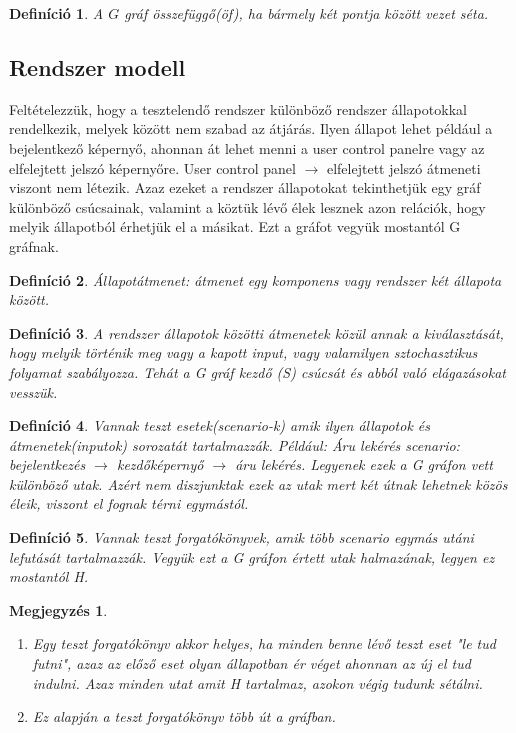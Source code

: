 \documentclass[12pt]{article}
\newtheorem{defin}{Definíció}[section]
\newtheorem{megj}{Megjegyzés}[section]
\begin{document}
\begin{defin}
A $G$ gráf összefüggő(öf), ha bármely két pontja között vezet séta. ~\cite{szam:Fleiner}
\end{defin}

\subsection{Rendszer modell}

Feltételezzük, hogy a tesztelendő rendszer különböző rendszer állapotokkal rendelkezik, melyek között nem szabad az átjárás. Ilyen állapot lehet például a bejelentkező képernyő, ahonnan át lehet menni a user control panelre vagy az elfelejtett jelszó képernyőre. User control panel $\rightarrow$ elfelejtett jelszó átmeneti viszont nem létezik. Azaz ezeket a rendszer állapotokat tekinthetjük egy gráf különböző csúcsainak, valamint a köztük lévő élek lesznek azon relációk, hogy melyik állapotból érhetjük el a másikat. Ezt a gráfot vegyük mostantól G gráfnak.\\

\begin{defin}
Állapotátmenet: átmenet egy komponens vagy rendszer két állapota között. ~\cite{htb:masterfield}
\end{defin}

\begin{defin}
A rendszer állapotok közötti átmenetek közül annak a kiválasztását, hogy melyik történik meg vagy a kapott input, vagy valamilyen sztochasztikus folyamat szabályozza. Tehát a G gráf kezdő (S) csúcsát és abból való elágazásokat vesszük.
\end{defin}

\begin{defin}
Vannak teszt esetek(scenario-k) amik ilyen állapotok és átmenetek(inputok) sorozatát tartalmazzák. Például: Áru lekérés scenario:  bejelentkezés $\rightarrow$ kezdőképernyő $\rightarrow$ áru lekérés. Legyenek ezek a G gráfon vett különböző utak. Azért nem diszjunktak ezek az utak mert két útnak lehetnek közös éleik, viszont el fognak térni egymástól.
\end{defin}

\begin{defin}
Vannak teszt forgatókönyvek, amik több scenario egymás utáni lefutását tartalmazzák. Vegyük ezt a G gráfon értett utak halmazának, legyen ez mostantól H.
\end{defin}

\begin{megj}
\begin{enumerate}
\item Egy teszt forgatókönyv akkor helyes, ha minden benne lévő teszt eset "le tud futni", azaz az előző eset olyan állapotban ér véget ahonnan az új el tud indulni. Azaz minden utat amit H tartalmaz, azokon végig tudunk sétálni.
\item Ez alapján a teszt forgatókönyv több út a gráfban.
\end{enumerate}
\end{megj}
\end{document}
